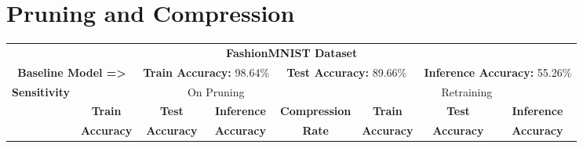 \section{Pruning and Compression}\label{pruning}


\begin{table*}[!htb]
\begin{center}
\renewcommand\arraystretch{1.5}
\fontsize{6.7pt}{6.7pt}\selectfont
\begin{tabular}{|c|c|c|c|c|c|c|c|}
\hline
\multicolumn{8}{|c|}{\textbf{FashionMNIST Dataset}}\\
\multicolumn{2}{|c}{\textbf{Baseline Model =>}} & \multicolumn{2}{c}{\textbf{Train Accuracy:} 98.64\%} & \multicolumn{2}{c}{\textbf{Test Accuracy:} 89.66\%} & \multicolumn{2}{c|}{\textbf{Inference Accuracy:} 55.26\%}\\
\hline
\multirow{3}{*}{\textbf{Sensitivity}} & \multicolumn{4}{|c|}{On Pruning} & \multicolumn{3}{|c|}{Retraining}\\
\hline
 & \textbf{Train}  & \textbf{Test}  & \textbf{Inference}  & \textbf{Compression} & \textbf{Train}  & \textbf{Test}  & \textbf{Inference}  \\
                      & \textbf{Accuracy} & \textbf{Accuracy} & \textbf{Accuracy} & \textbf{Rate} & \textbf{Accuracy} & \textbf{Accuracy} & \textbf{Accuracy}  \\


\end{tabular}
\end{center}
\end{table*}
